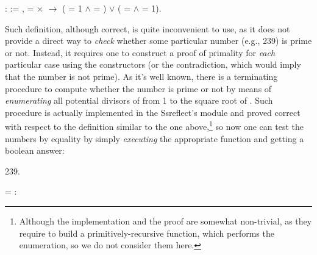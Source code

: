 

\begin{coqdoccode}
\coqdocemptyline
\coqdocnoindent
{}   :  :=\coqdoceol
\coqdocindent{1.00em}
\coqdockw{\ensuremath{\forall}}  ,  =  \ensuremath{\times}  \ensuremath{\rightarrow} ( = 1 \ensuremath{\land}  = ) \ensuremath{\lor} ( =  \ensuremath{\land}  = 1).\coqdoceol
\coqdocemptyline
\end{coqdoccode}


Such definition, although correct, is quite inconvenient to use, as it
does not provide a direct way to \textit{check} whether some particular
number (e.g., 239) is prime or not. Instead, it requires one to
construct a proof of primality for \textit{each} particular case using the
constructors (or the contradiction, which would imply that the number
is not prime). As it's well known, there is a terminating procedure to
compute whether the number is prime or not by means of \textit{enumerating}
all potential divisors of  from 1 to the square root of . Such
procedure is actually implemented in the Ssreflect's 
 module and proved correct with respect to the
definition similar to the one above,\footnote{Although the
implementation and the proof are somewhat non-trivial, as they require
to build a primitively-recursive function, which performs the
enumeration, so we do not consider them here.} so now one can test
the numbers by equality by simply \textit{executing} the appropriate function
and getting a boolean answer:


\begin{coqdoccode}
\coqdocemptyline
\coqdocnoindent
{}    239.\coqdoceol
\end{coqdoccode}


\coqdoceol
\coqdocemptyline
\coqdocindent{2.50em}
= \coqdoceol
\coqdocindent{2.50em}
: 

\coqdocemptyline


